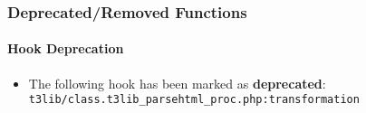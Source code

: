 %

\begin{frame}[fragile]
	\frametitle{Deprecated/Removed Functions}
	\framesubtitle{Hook Deprecation}

	\begin{itemize}
		\item The following hook has been marked as \textbf{deprecated}:\newline
			\small
				\texttt{t3lib/class.t3lib\_parsehtml\_proc.php:transformation}
			\normalsize
	\end{itemize}

\end{frame}

